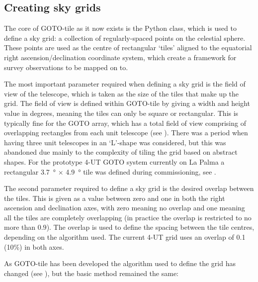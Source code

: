 \subsection{Creating sky grids}
\label{sec:grids}
\begin{colsection}

The core of GOTO-tile as it now exists is the  Python class, which is used to define a sky grid: a collection of regularly-spaced points on the celestial sphere. These points are used as the centre of rectangular `tiles' aligned to the equatorial right ascension/declination coordinate system, which create a framework for survey observations to be mapped on to.

The most important parameter required when defining a sky grid is the field of view of the telescope, which is taken as the size of the tiles that make up the grid. The field of view is defined within GOTO-tile by giving a width and height value in degrees, meaning the tiles can only be square or rectangular. This is typically fine for the GOTO array, which has a total field of view comprising of overlapping rectangles from each unit telescope (see ). There was a period when having three unit telescopes in an `L'-shape was considered, but this was abandoned due mainly to the complexity of tiling the grid based on abstract shapes. For the prototype 4-UT GOTO system currently on La Palma a rectangular \SI{3.7}{\degree} $\times$ \SI{4.9}{\degree} tile was defined during commissioning, see .

The second parameter required to define a sky grid is the desired overlap between the tiles. This is given as a value between zero and one in both the right ascension and declination axes, with zero meaning no overlap and one meaning all the tiles are completely overlapping (in practice the overlap is restricted to no more than $0.9$). The overlap is used to define the spacing between the tile centres, depending on the algorithm used. The current 4-UT grid uses an overlap of 0.1 (10\%) in both axes.

As GOTO-tile has been developed the algorithm used to define the grid has changed (see ), but the basic method remained the same:


\end{colsection}
